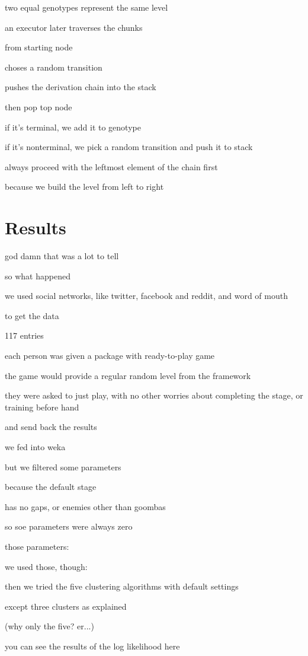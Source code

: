 \documentclass[conference]{IEEEtran}
\begin{document}
two equal genotypes represent the same level

an executor later traverses the chunks

from starting node

choses a random transition

pushes the derivation chain into the stack

then pop top node

if it's terminal, we add it to genotype

if it's nonterminal, we pick a random transition and push it to stack

always proceed with the leftmost element of the chain first

because we build the level from left to right

\section{Results}

god damn that was a lot to tell

so what happened

we used social networks, like twitter, facebook and reddit, and word of mouth

to get the data

117 entries

each person was given a package with ready-to-play game

the game would provide a regular random level from the framework

they were asked to just play, with no other worries about completing the stage, or training before hand

and send back the results

we fed into weka 

but we filtered some parameters

because the default stage

has no gaps, or enemies other than goombas

so soe parameters were always zero

those parameters:

we used those, though:

then we tried the five clustering algorithms with default settings

except three clusters as explained

(why only the five? er...)

you can see the results of the log likelihood here
\end{document}

